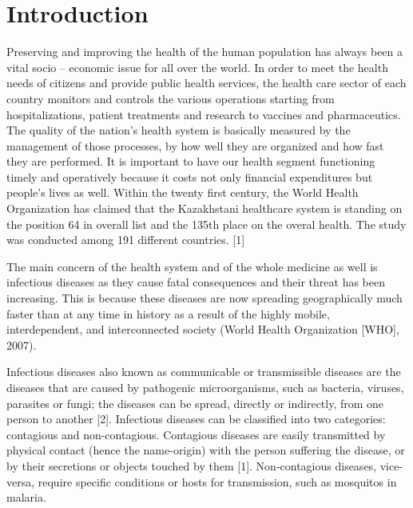\chapter*{Introduction}

Preserving and improving the health of the human population has always been a vital socio – economic issue for all over the world. In order to meet the health needs of citizens and provide public health services, the health care sector of each country monitors and controls the various operations starting from hospitalizations, patient treatments and research to vaccines and pharmaceutics. The quality of the nation’s health system is basically measured by the management of those processes, by how well they are organized and how fast they are performed. It is important to have our health segment functioning timely and operatively because it costs not only financial expenditures but people’s lives as well. Within the twenty first century, the World Health Organization has claimed that the Kazakhstani healthcare system is standing on the position 64 in overall list and the 135th place on the overal health. The study was conducted among 191 different countries. [1]

The main concern of the health system and of the whole medicine as well is infectious diseases as they cause fatal consequences and their threat has been increasing. This is because these diseases are now spreading geographically much faster than at any time in history as a result of the highly mobile, interdependent, and interconnected society (World Health Organization [WHO], 2007).

Infectious diseases also known as communicable or transmissible diseases are the diseases that are caused by pathogenic microorganisms, such as bacteria, viruses, parasites or fungi; the diseases can be spread, directly or indirectly, from one person to another [2]. Infectious diseases can be classified into two categories: contagious and non-contagious. Contagious diseases are easily transmitted by physical contact (hence the name-origin) with the person suffering the disease, or by their secretions or objects touched by them [1].  Non-contagious diseases, vice-versa, require specific conditions or hosts for transmission, such as mosquitos in malaria.

